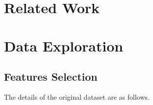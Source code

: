 \documentclass[
]{article}
\begin{document}
\hypertarget{related-work}{%
\section{Related Work}\label{related-work}}

\hypertarget{data-exploration}{%
\section{Data Exploration}\label{data-exploration}}

\hypertarget{features-selection}{%
\subsection{Features Selection}\label{features-selection}}

The details of the original dataset are as follows.
\end{document}
